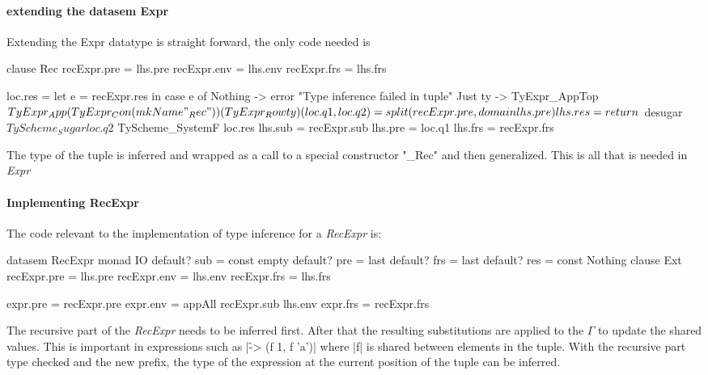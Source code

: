\paragraph{extending the datasem Expr}
Extending the Expr datatype is straight forward, the only code needed is

\begin{code}
clause Rec
   recExpr.pre  = lhs.pre
   recExpr.env  = lhs.env
   recExpr.frs  = lhs.frs
   
   loc.res =  let e = recExpr.res
              in case e of
                   Nothing  ->  error "Type inference failed in tuple"
                   Just ty  ->  TyExpr_AppTop $
                                   TyExpr_App
                                      (TyExpr_Con (mkName "_Rec"))
                                      (TyExpr_Row ty)
   
   (loc.q1, loc.q2) = split (recExpr.pre, domain lhs.pre)
   lhs.res = return  $ desugar 
                     $ TyScheme_Sugar loc.q2 
                     $ TyScheme_SystemF loc.res
   lhs.sub  = recExpr.sub
   lhs.pre  = loc.q1
   lhs.frs  = recExpr.frs
\end{code}
The type of the tuple is inferred and wrapped as a call to a special constructor "\_Rec" and then generalized. This is all that is needed in \emph{Expr}

\paragraph{Implementing RecExpr}
The code relevant to the implementation of type inference for a \emph{RecExpr} is:

\begin{code}
datasem RecExpr monad IO
 default? sub = const empty
 default? pre = last
 default? frs = last
 default? res = const Nothing
 clause Ext
   recExpr.pre  = lhs.pre
   recExpr.env  = lhs.env
   recExpr.frs  = lhs.frs
   
   expr.pre  = recExpr.pre
   expr.env  = appAll recExpr.sub lhs.env
   expr.frs  = recExpr.frs
\end{code}
The recursive part of the \emph{RecExpr} needs to be inferred first. After that the resulting substitutions are applied to the $\Gamma$ to update the shared values. This is important in expressions such as |\f -> (f 1, f 'a')| where |f| is shared between elements in the tuple. With the recursive part type checked and the new prefix, the type of the expression at the current position of the tuple can be inferred.

